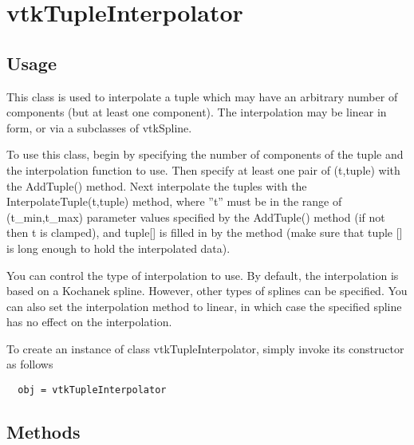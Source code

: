 \section{vtkTupleInterpolator}

\subsection{Usage}

 This class is used to interpolate a tuple which may have an arbitrary
 number of components (but at least one component). The interpolation may
 be linear in form, or via a subclasses of vtkSpline.

 To use this class, begin by specifying the number of components of the
 tuple and the interpolation function to use. Then specify at least one
 pair of (t,tuple) with the AddTuple() method.  Next interpolate the
 tuples with the InterpolateTuple(t,tuple) method, where ''t'' must be in the
 range of (t\_min,t\_max) parameter values specified by the AddTuple() method
 (if not then t is clamped), and tuple[] is filled in by the method (make
 sure that tuple [] is long enough to hold the interpolated data).

 You can control the type of interpolation to use. By default, the
 interpolation is based on a Kochanek spline. However, other types of
 splines can be specified. You can also set the interpolation method
 to linear, in which case the specified spline has no effect on the
 interpolation.

To create an instance of class vtkTupleInterpolator, simply
invoke its constructor as follows
\begin{verbatim}
  obj = vtkTupleInterpolator
\end{verbatim}
\subsection{Methods}

